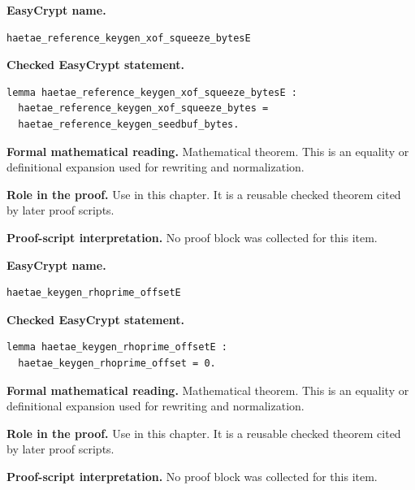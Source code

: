 \begin{formaltheorem}
\noindent\textbf{EasyCrypt name.}
\begin{lstlisting}[language=EasyCrypt,basicstyle=\ttfamily\scriptsize]
haetae_reference_keygen_xof_squeeze_bytesE
\end{lstlisting}
\noindent\textbf{Checked EasyCrypt statement.}
\begin{lstlisting}[language=EasyCrypt,basicstyle=\ttfamily\scriptsize]
lemma haetae_reference_keygen_xof_squeeze_bytesE :
  haetae_reference_keygen_xof_squeeze_bytes =
  haetae_reference_keygen_seedbuf_bytes.
\end{lstlisting}
\noindent\textbf{Formal mathematical reading.}
Mathematical theorem. This is an equality or definitional expansion used for rewriting and normalization.

\noindent\textbf{Role in the proof.}
Use in this chapter. It is a reusable checked theorem cited by later proof scripts.

\noindent\textbf{Proof-script interpretation.}
No proof block was collected for this item.

\end{formaltheorem}

\begin{formaltheorem}
\noindent\textbf{EasyCrypt name.}
\begin{lstlisting}[language=EasyCrypt,basicstyle=\ttfamily\scriptsize]
haetae_keygen_rhoprime_offsetE
\end{lstlisting}
\noindent\textbf{Checked EasyCrypt statement.}
\begin{lstlisting}[language=EasyCrypt,basicstyle=\ttfamily\scriptsize]
lemma haetae_keygen_rhoprime_offsetE :
  haetae_keygen_rhoprime_offset = 0.
\end{lstlisting}
\noindent\textbf{Formal mathematical reading.}
Mathematical theorem. This is an equality or definitional expansion used for rewriting and normalization.

\noindent\textbf{Role in the proof.}
Use in this chapter. It is a reusable checked theorem cited by later proof scripts.

\noindent\textbf{Proof-script interpretation.}
No proof block was collected for this item.

\end{formaltheorem}

